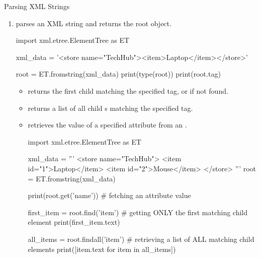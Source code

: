 \documentclass[10pt]{article}
\begin{document}
    \begin{core}{Parsing XML Strings}

      \begin{enumerate}

        \item {} parses an XML string and returns the root  object.

        \begin{pyconsole}

          import xml.etree.ElementTree as ET

          xml_data = '<store name="TechHub"><item>Laptop</item></store>'

          root = ET.fromstring(xml_data)
          print(type(root))
          print(root.tag)

        \end{pyconsole}

        \begin{itemize}

          \item {} returns the first child  matching the specified tag, or  if not found.

          \item {} returns a list of all child s matching the specified tag.

          \item {} retrieves the value of a specified attribute from an .

          \begin{pyconsole}

            import xml.etree.ElementTree as ET

            xml_data = '''
            <store name="TechHub">
                <item id="1">Laptop</item>
                <item id="2">Mouse</item>
            </store>
            '''
            root = ET.fromstring(xml_data)

            print(root.get('name')) # fetching an attribute value

            first_item = root.find('item') # getting ONLY the first matching child element
            print(first_item.text)

            all_items = root.findall('item') # retrieving a list of ALL matching child elements
            print([item.text for item in all_items])

          \end{pyconsole}

        \end{itemize}

      \end{enumerate}

    \end{core}
\end{document}
